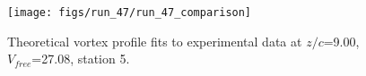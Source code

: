 \begin{figure}[H]
\centering
\texttt{[image: figs/run\_47/run\_47\_comparison]}
\caption{Theoretical vortex profile fits to experimental data at $z/c$=9.00, $V_{free}$=27.08, station 5.}
\end{figure}


